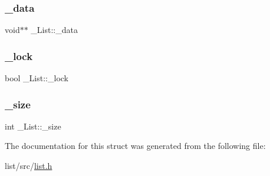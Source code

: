 \mbox{\label{struct__List_a6dc233faef712458daa3667ba09cfcbf}} 
\subsubsection{\texorpdfstring{\+\_\+data}{\_data}}
{\footnotesize\ttfamily void$\ast$$\ast$ \+\_\+\+List\+::\+\_\+data}

\mbox{\label{struct__List_aa424250bd616a9439c83b2521d13c242}} 
\subsubsection{\texorpdfstring{\+\_\+lock}{\_lock}}
{\footnotesize\ttfamily bool \+\_\+\+List\+::\+\_\+lock}

\mbox{\label{struct__List_acccc526abfc4d69b37bb167adc029107}} 
\subsubsection{\texorpdfstring{\+\_\+size}{\_size}}
{\footnotesize\ttfamily int \+\_\+\+List\+::\+\_\+size}



The documentation for this struct was generated from the following file\+:\begin{DoxyCompactItemize}
\item 
list/src/\mbox{\hyperlink{list_8h}{list.\+h}}\end{DoxyCompactItemize}
